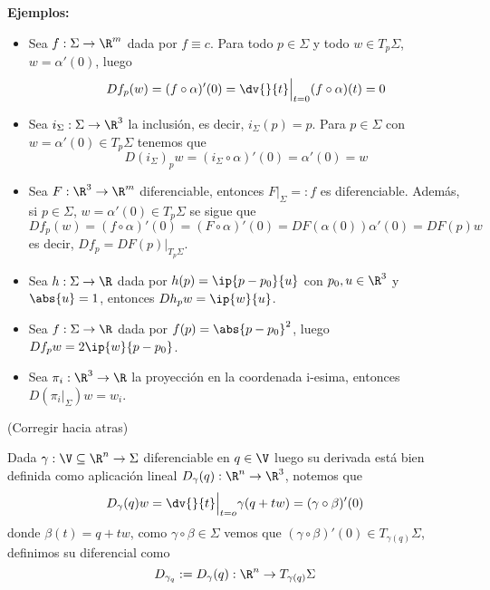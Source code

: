 \documentclass{article}
\begin{document}
\noindent\textbf{Ejemplos:}
\begin{itemize}
    \item Sea $f:\Sigma\to\R^{m}$ dada por $f\equiv c$. Para todo $p\in\Sigma$ y todo 
    $w\in T_{p}\Sigma$, $w=\alpha'(0)$, luego
    \begin{equation*}
        Df_{p}(w)=(f\circ\alpha)'(0)=\dv{}{t}\Big|_{t=0}(f\circ\alpha)(t)=0
    \end{equation*}

    \item Sea $i_{\Sigma}:\Sigma\to\R^{3}$ la inclusión, es decir, $i_{\Sigma}(p)=p$. Para 
    $p\in\Sigma$ con $w=\alpha'(0)\in T_{p}\Sigma$ tenemos que
    \begin{equation*}
        D(i_{\Sigma})_{p}w=(i_{\Sigma}\circ\alpha)'(0)=\alpha'(0)=w
    \end{equation*}

    \item Sea $F:\R^{3}\to\R^{m}$ diferenciable, entonces $F\big|_{\Sigma}=:f$ es diferenciable.
    Además, si $p\in\Sigma$, $w=\alpha'(0)\in T_{p}\Sigma$ se sigue que
    \begin{equation*}
        Df_{p}(w)=(f\circ\alpha)'(0)=(F\circ\alpha)'(0)=DF(\alpha(0))\alpha'(0)=DF(p)w
    \end{equation*}
    es decir, $Df_{p}=DF(p)\big|_{T_{p}\Sigma}$.

    \item Sea $h:\Sigma\to\R$ dada por $h(p)=\ip{p-p_{0}}{u}$ con $p_{0},u\in\R^{3}$ y $\abs{u}=1$,
    entonces $Dh_{p}w=\ip{w}{u}$.

    \item Sea $f:\Sigma\to\R$ dada por $f(p)=\abs{p-p_{0}}^{2}$, luego
    $Df_{p}w=2\ip{w}{p-p_{0}}$.

    \item Sea $\pi_{i}:\R^{3}\to\R$ la proyección en la coordenada i-esima, entonces
    $D\left(\pi_{i}\big|_{\Sigma}\right)w=w_{i}$.
\end{itemize}

\noindent (Corregir hacia atras)

\noindent Dada $\gamma:\V\subseteq\R^{n}\to\Sigma$ diferenciable en $q\in\V$ luego su derivada 
está bien definida como aplicación lineal $D_{\gamma}(q):\R^{n}\to\R^{3}$, notemos que
\begin{equation*}
    D_{\gamma}(q)w=\dv{}{t}\Big|_{t=o}\gamma(q+tw)=(\gamma\circ\beta)'(0)
\end{equation*}
donde $\beta(t)=q+tw$, como $\gamma\circ\beta\in\Sigma$ vemos que $(\gamma\circ\beta)'(0)\in
T_{\gamma(q)}\Sigma$, definimos su diferencial como
\begin{equation*}
    D_{\gamma_{q}}:=D_{\gamma}(q):\R^{n}\to T_{\gamma(q)}\Sigma
\end{equation*}
\end{document}
